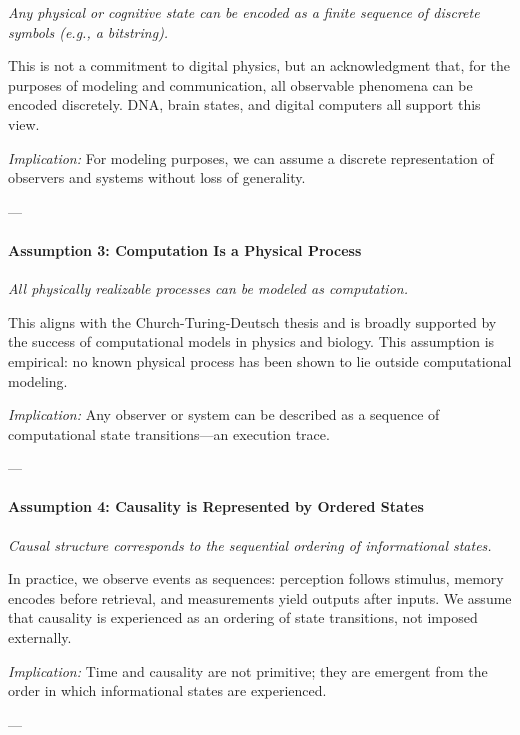 \documentclass[12pt]{article}
\begin{document}
\emph{Any physical or cognitive state can be encoded as a finite sequence of discrete symbols (e.g., a bitstring).}

\vspace{0.2em}
This is not a commitment to digital physics, but an acknowledgment that, for the purposes of modeling and communication, all observable phenomena can be encoded discretely. DNA, brain states, and digital computers all support this view.

\emph{Implication:} For modeling purposes, we can assume a discrete representation of observers and systems without loss of generality.

---

\paragraph{Assumption 3: Computation Is a Physical Process}

\emph{All physically realizable processes can be modeled as computation.}

\vspace{0.2em}
This aligns with the Church-Turing-Deutsch thesis and is broadly supported by the success of computational models in physics and biology. This assumption is empirical: no known physical process has been shown to lie outside computational modeling.

\emph{Implication:} Any observer or system can be described as a sequence of computational state transitions—an execution trace.

---

\paragraph{Assumption 4: Causality is Represented by Ordered States}

\emph{Causal structure corresponds to the sequential ordering of informational states.}

\vspace{0.2em}
In practice, we observe events as sequences: perception follows stimulus, memory encodes before retrieval, and measurements yield outputs after inputs. We assume that causality is experienced as an ordering of state transitions, not imposed externally.

\emph{Implication:} Time and causality are not primitive; they are emergent from the order in which informational states are experienced.

---
\end{document}
